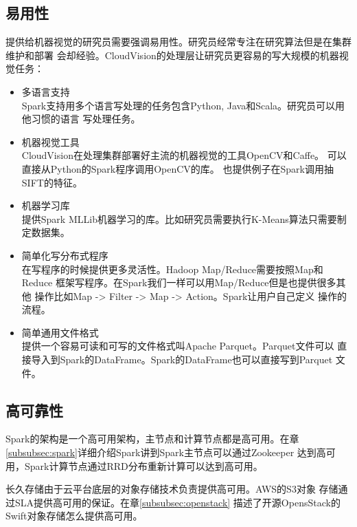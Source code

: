 \subsection{易用性}
提供给机器视觉的研究员需要强调易用性。研究员经常专注在研究算法但是在集群维护和部署
会却经验。CloudVision的处理层让研究员更容易的写大规模的机器视觉任务：
\begin{itemize}
  \item 多语言支持 \\
        Spark支持用多个语言写处理的任务包含Python, Java和Scala。研究员可以用他习惯的语言
        写处理任务。
  \item 机器视觉工具 \\
        CloudVision在处理集群部署好主流的机器视觉的工具OpenCV和Caffe。
        可以直接从Python的Spark程序调用OpenCV的库。
        也提供例子在Spark调用抽SIFT的特征。
  \item 机器学习库 \\
        提供Spark MLLib机器学习的库。比如研究员需要执行K-Means算法只需要制定数据集。
  \item 简单化写分布式程序 \\
        在写程序的时候提供更多灵活性。Hadoop Map/Reduce需要按照Map和Reduce
        框架写程序。在Spark我们一样可以用Map/Reduce但是也提供很多其他
        操作比如Map -> Filter -> Map -> Action。Spark让用户自己定义
        操作的流程。
  \item 简单通用文件格式 \\
        提供一个容易可读和可写的文件格式叫Apache Parquet。Parquet文件可以
        直接导入到Spark的DataFrame。Spark的DataFrame也可以直接写到Parquet
        文件。
\end{itemize}


\subsection{高可靠性}
Spark的架构是一个高可用架构，主节点和计算节点都是高可用。在章
\ref{subsubsec:spark}详细介绍Spark讲到Spark主节点可以通过Zookeeper
达到高可用，Spark计算节点通过RRD分布重新计算可以达到高可用。

长久存储由于云平台底层的对象存储技术负责提供高可用。AWS的S3对象
存储通过SLA提供高可用的保证。在章\ref{subsubsec:openstack}
描述了开源OpensStack的Swift对象存储怎么提供高可用。

